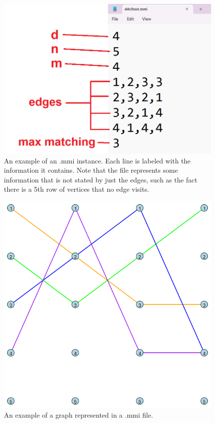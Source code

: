 \begin{figure}[t!]
    \centering
    \begin{minipage}{0.45\textwidth}
        \centering
        \includegraphics[width=\textwidth]{images/exampleMMI.png}
        \caption{An example of an .mmi instance. Each line is labeled with the information
        it contains. Note that the file represents some information that is not stated by 
        just the edges, such as the fact there is a 5th row of vertices that no edge visits.}
        \label{fig:exampleMMi}
    \end{minipage}
    \hfill
\end{figure}

\begin{figure}[t!]
    \centering
    \begin{minipage}{0.45\textwidth}
        \centering
        \includegraphics[width=\textwidth]{images/d4v5test.png}
        \caption{An example of a graph represented in a .mmi file.}
        \label{fig:d4v5}
    \end{minipage}
    \hfill
\end{figure}


